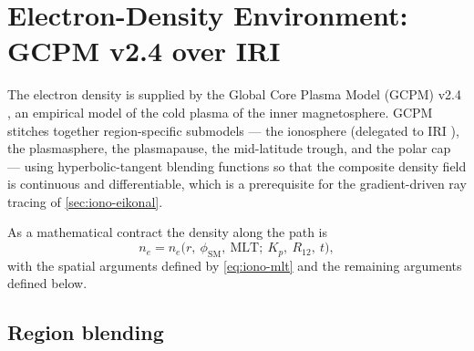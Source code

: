 \section{Electron-Density Environment: GCPM v2.4 over IRI}
\label{sec:iono-density}

The electron density is supplied by the Global Core Plasma Model (GCPM) v2.4
\citep{gallagher2000gcpm}, an empirical model of the cold plasma of the inner
magnetosphere.  GCPM stitches together region-specific submodels --- the
ionosphere (delegated to IRI \citep{bilitza2022iri}), the plasmasphere, the
plasmapause, the mid-latitude trough, and the polar cap --- using
hyperbolic-tangent blending functions so that the composite density field is
continuous and differentiable, which is a prerequisite for the gradient-driven
ray tracing of \cref{sec:iono-eikonal}.

As a mathematical contract the density along the path is
%
\begin{equation}
  \label{eq:iono-ne-model}
  n_e = n_e\big(r,\ \phi_\mathrm{SM},\ \mathrm{MLT};\ K_p,\ R_{12},\ t\big) ,
\end{equation}
%
with the spatial arguments defined by \cref{eq:iono-mlt} and the remaining
arguments defined below.

\subsection{Region blending}
\label{sec:iono-blending}

